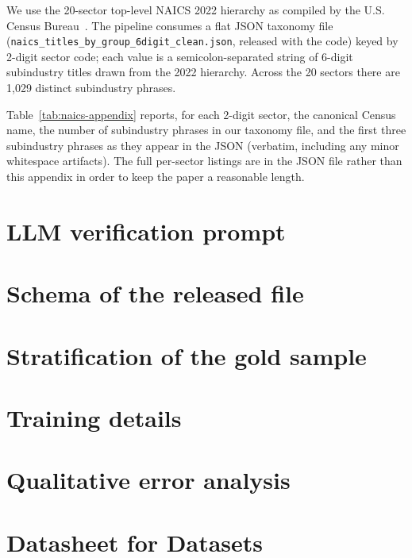 \documentclass{article}
\begin{document}
We use the 20-sector top-level NAICS 2022 hierarchy as compiled by
the U.S. Census Bureau~\citep{naics2022}. The pipeline consumes a
flat JSON taxonomy file
(\texttt{naics\_titles\_by\_group\_6digit\_clean.json}, released with
the code) keyed by 2-digit sector code; each value is a
semicolon-separated string of 6-digit subindustry titles drawn from
the 2022 hierarchy. Across the 20 sectors there are 1{,}029 distinct
subindustry phrases.

Table~\ref{tab:naics-appendix} reports, for each 2-digit sector, the
canonical Census name, the number of subindustry phrases in our
taxonomy file, and the first three subindustry phrases as they
appear in the JSON (verbatim, including any minor whitespace
artifacts). The full per-sector listings are in the JSON file rather
than this appendix in order to keep the paper a reasonable length.



\section{LLM verification prompt}
\label{app:prompt}



\section{Schema of the released file}
\label{app:schema}



\section{Stratification of the gold sample}
\label{app:stratification}



\section{Training details}
\label{app:training}



\section{Qualitative error analysis}
\label{app:error-analysis}

\section{Datasheet for Datasets}
\label{app:datasheet}


\end{document}
